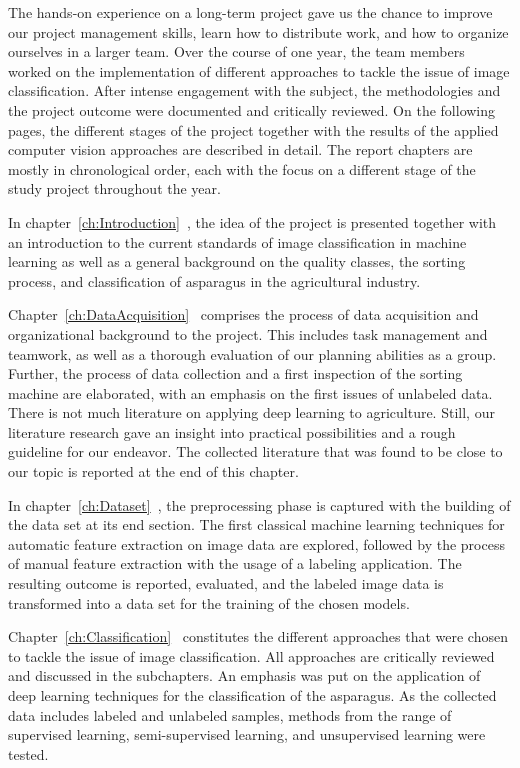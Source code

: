 The hands-on experience on a long-term project gave us the chance to improve our project management skills, learn how to distribute work, and how to organize ourselves in a larger team. Over the course of one year, the team members worked on the implementation of different approaches to tackle the issue of image classification. After intense engagement with the subject, the methodologies and the project outcome were documented and critically reviewed. On the following pages, the different stages of the project together with the results of the applied computer vision approaches are described in detail. The report chapters are mostly in chronological order, each with the focus on a different stage of the study project throughout the year.

\bigskip
In chapter~\ref{ch:Introduction}~, the idea of the project is presented together with an introduction to the current standards of image classification in machine learning as well as a general background on the quality classes, the sorting process, and classification of asparagus in the agricultural industry.

Chapter~\ref{ch:DataAcquisition}~ comprises the process of data acquisition and organizational background to the project. This includes task management and teamwork, as well as a thorough evaluation of our planning abilities as a group. Further, the process of data collection and a first inspection of the sorting machine are elaborated, with an emphasis on the first issues of unlabeled data. There is not much literature on applying deep learning to agriculture. Still, our literature research gave an insight into practical possibilities and a rough guideline for our endeavor. The collected literature that was found to be close to our topic is reported at the end of this chapter.

In chapter~\ref{ch:Dataset}~, the preprocessing phase is captured with the building of the data set at its end section. The first classical machine learning techniques for automatic feature extraction on image data are explored, followed by the process of manual feature extraction with the usage of a labeling application. The resulting outcome is reported, evaluated, and the labeled image data is transformed into a data set for the training of the chosen models.

Chapter~\ref{ch:Classification}~ constitutes the different approaches that were chosen to tackle the issue of image classification. All approaches are critically reviewed and discussed in the subchapters. An emphasis was put on the application of deep learning techniques for the classification of the asparagus. As the collected data includes labeled and unlabeled samples, methods from the range of supervised learning, semi-supervised learning, and unsupervised learning were tested.

